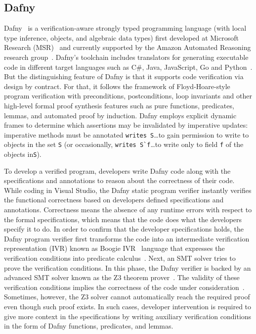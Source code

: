 
\subsection{Dafny}
Dafny~\cite{dafnytsite} is a verification-aware strongly typed programming language 
(with local type inference, objects, and algebraic data types)
first developed at Microsoft Research (MSR)~\cite{microsoftresearch} and  currently supported by the Amazon Automated Reasoning research group~\cite{awsautomatedreasoning}. Dafny's toolchain includes translators for generating executable code in different target languages such as C\#, Java, JavaScript, Go and Python~\cite{dafny-github}. But the distinguishing feature of Dafny is that it supports code verification via design by contract. For that, it follows the framework of Floyd-Hoare-style ~\cite{DBLP:journals/cacm/Hoare69} program verification with preconditions, postconditions, loop invariants and other high-level formal proof synthesis features such as pure functions, predicates, lemmas, and automated proof by induction. Dafny employs explicit dynamic frames to determine which assertions may be invalidated by imperative updates: imperative methods must be annotated \lstinline+writes S+\ldots to gain permission to write to objects in the set \lstinline+S+ (or occasionally, \lstinline+writes S`f+\ldots to write only to field \lstinline+f+ of the objects in\lstinline+S+).

To develop a verified program, developers write Dafny code along with
the specifications and annotations to reason about the correctness of
their code. While coding in Visual Studio, the Dafny static program
verifier instantly verifies the functional correctness based on
developers defined specifications and annotations. Correctness means
the absence of any runtime errors with respect to the formal
specifications, which means that the code does what the developers
specify it to do. In order to confirm that the developer
specifications holds, the Dafny program verifier first transforms the
code into an intermediate verification representation (IVR) known as
Boogie IVR~\cite{le2011boogie} language that expresses the
verification conditions into predicate
calculus~\cite{DBLP:journals/software/Leino17}. Next, an SMT solver
tries to prove the verification conditions. In this phase, the Dafny
verifier is backed by an advanced SMT solver known as the Z3 theorem
prover~\cite{Z3-tacas2008}. The validity of these verification
conditions implies the correctness of the code under
consideration~\cite{DBLP:journals/software/Leino17}. Sometimes,
however, the Z3 solver cannot automatically reach the required proof
even though such proof exists. In such cases, developer intervention
is required to give more context in the specifications by writing
auxiliary verification conditions in the form of Dafny functions,
predicates, and lemmas.

